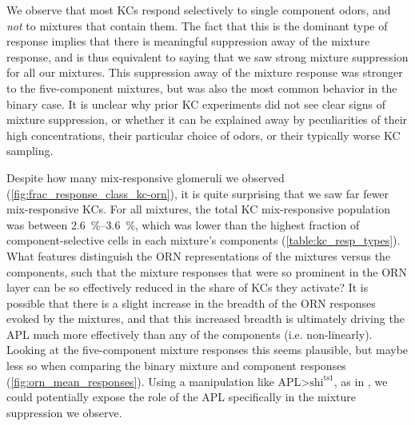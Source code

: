 \documentclass[12pt]{caltech_thesis}
\renewcommand{\cite}{{ }\autocite}
\newcommand{\ShibireTsShort}{\ensuremath{\text{shi}^{\text{ts1}}}}
\begin{document}
\begin{refsection}
We observe that most KCs respond selectively to single component odors, and \textit{not} to mixtures that contain them.
The fact that this is the dominant type of response implies that there is meaningful suppression away of the mixture response, and is thus equivalent to saying that we saw strong mixture suppression for all our mixtures.
This suppression away of the mixture response was stronger to the five-component mixtures, but was also the most common behavior in the binary case.
It is unclear why prior KC experiments did not see clear signs of mixture suppression, or whether it can be explained away by peculiarities of their high concentrations, their particular choice of odors, or their typically worse KC sampling.

Despite how many mix-responsive glomeruli we observed (\cref{fig:frac_response_class_kc-orn}), it is quite surprising that we saw far fewer mix-responsive KCs.
For all mixtures, the total KC mix-responsive population was between \qtyrange{2.6}{3.6}{\percent}, which was lower than the highest fraction of component-selective cells in each mixture's components (\cref{table:kc_resp_types}).
What features distinguish the ORN representations of the mixtures versus the components, such that the mixture responses that were so prominent in the ORN layer can be so effectively reduced in the share of KCs they activate?
It is possible that there is a slight increase in the breadth of the ORN responses evoked by the mixtures, and that this increased breadth is ultimately driving the APL much more effectively than any of the components (i.e. non-linearly).
Looking at the five-component mixture responses this seems plausible, but maybe less so when comparing the binary mixture and component responses (\cref{fig:orn_mean_responses}).
Using a manipulation like APL>\ShibireTsShort, as in \textcite{Lin2014}, we could potentially expose the role of the APL specifically in the mixture suppression we observe.


\end{refsection}
\end{document}
